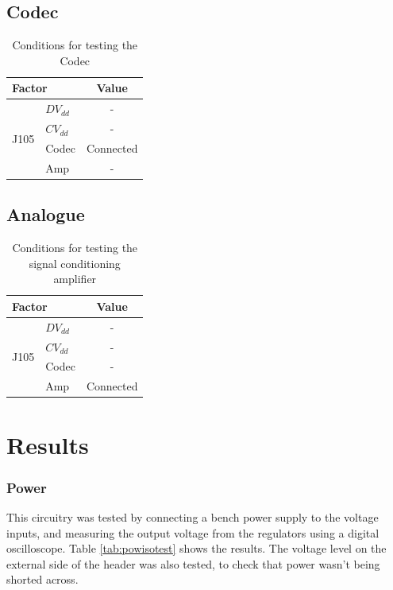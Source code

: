 \subsection{Codec}
\begin{table}[H]
	\centering
	\begin{tabular}[c]{| l | l | c |}
		\hline
		\multicolumn{2}{|l|}{Factor}		& Value	\\
		\hline
		\multirow{4}{*}{J105}	& $DV_{dd}$	& -		\\
					& $CV_{dd}$	& -		\\
					& Codec		& Connected	\\
					& Amp		& -		\\
		\hline
	\end{tabular}
	\caption{Conditions for testing the Codec}
	\label{tab:codectestconditions}
\end{table}


\subsection{Analogue}
\begin{table}[H]
	\centering
	\begin{tabular}[c]{| l | l | c |}
		\hline
		\multicolumn{2}{|l|}{Factor}		& Value	\\
		\hline
		\multirow{4}{*}{J105}	& $DV_{dd}$	& -		\\
					& $CV_{dd}$	& -		\\
					& Codec		& -		\\
					& Amp		& Connected	\\
		\hline
	\end{tabular}
	\caption{Conditions for testing the signal conditioning amplifier}
	\label{tab:analoguetestconditions}
\end{table}

\section{Results}
\label{ssec:testHWresults}
\subsubsection{Power}
This circuitry was tested by connecting a bench power supply to the voltage inputs, and measuring the output voltage from the regulators using a digital oscilloscope.
Table \ref{tab:powisotest} shows the results.
The voltage level on the external side of the header was also tested, to check that power wasn't being shorted across.

